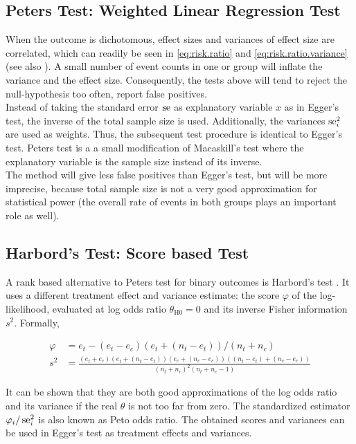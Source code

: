 \documentclass[11pt,a4paper,twoside]{book}\usepackage[]{graphicx}\usepackage[]{color}
\begin{document}
\subsection{Peters Test: Weighted Linear Regression Test} \label{sec:Peter}
When the outcome is dichotomous, effect sizes and variances of effect size are correlated, which can readily be seen in \eqref{eq:risk.ratio} and \eqref{eq:risk.ratio.variance} (see also \cite[120]{meta.w.R}). A small number of event counts in one or group will inflate the variance and the effect size. Consequently, the tests above will tend to reject the null-hypothesis too often, \ie report false positives.\\ 
Instead of taking the standard error $\operatorname{se}$ as explanatory variable $x$ as in Egger's test, the inverse of the total sample size is used. Additionally, the variances $\operatorname{se}_i^2$ are used as weights. Thus, the subsequent test procedure is identical to Egger's test. Peters test is a a small modification of Macaskill's test where the explanatory variable is the sample size instead of its inverse. \\
The method will give less false positives than Egger's test, but will be more imprecise, because total sample size is not a very good approximation for statistical power (the overall rate of events in both groups plays an important role as well).



\subsection{Harbord's Test: Score based Test} \label{sec:Harbord}
A rank based alternative to Peters test for binary outcomes is Harbord's test \citep{Harbord}.
It uses a different treatment effect and variance estimate: the score $\varphi$ of the log-likelihood, evaluated at log odds ratio $\theta_\textrm{H0} = 0$ and its inverse Fisher information $s^2$. Formally,

\begin{align}
\varphi &= e_t - (e_t - e_c)(e_t + (n_t - e_t))/(n_t + n_c) \label{harbord.score} \\
 s^2 &= \frac{(e_t + e_c)(e_t + (n_t - e_t))(e_c + (n_c - e_c))((n_t - e_t) + (n_c - e_c))}{(n_t + n_c)^2(n_t + n_c - 1)} \label{harbord.variance}
\end{align}

It can be shown that they are both good approximations of the log odds ratio and its variance if the real $\theta$ is not too far from zero. The standardized estimator $\varphi_i/\operatorname{se}_i^2$ is also known as Peto odds ratio. The obtained scores and variances can be used in Egger's test as treatment effects and variances.
\end{document}
